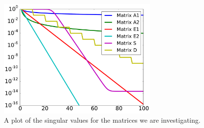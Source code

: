\begin{figure}
\centering
\includegraphics[width=8cm]{plots/sing_value_plot_dis.pdf}
\caption[Matrix Singular Values]{
A plot of the singular values for the matrices we
are investigating.}
\label{fig:sing_decay}
\end{figure}
